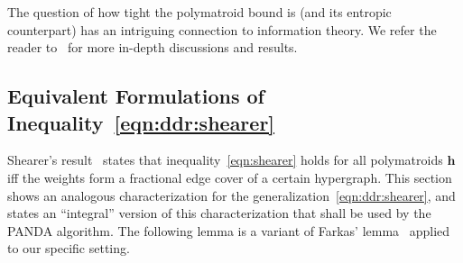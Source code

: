 \documentclass[10pt,a4paper]{article}
\newcommand{\panda}{\textsf{PANDA}\xspace}
\begin{document}
The question of how tight the polymatroid bound is (and its entropic counterpart) has
an intriguing connection to information theory. We refer the reader to~\cite{DBLP:conf/pods/Khamis0S17,10175769}
for more in-depth discussions and results.

\subsection{Equivalent Formulations of Inequality~\eqref{eqn:ddr:shearer}}
\label{subsec:equivalent}

Shearer's result~\cite{MR859293} states that inequality~\eqref{eqn:shearer} holds for all
polymatroids $\bm h$ iff the weights form a fractional edge cover of a certain hypergraph.
This section shows an analogous characterization for the
generalization~\eqref{eqn:ddr:shearer}, and states an ``integral'' version of this
characterization that shall be used by the \panda algorithm.
The following lemma is a variant of Farkas' lemma~\cite{schrijver-book} applied to our specific setting.
\end{document}
